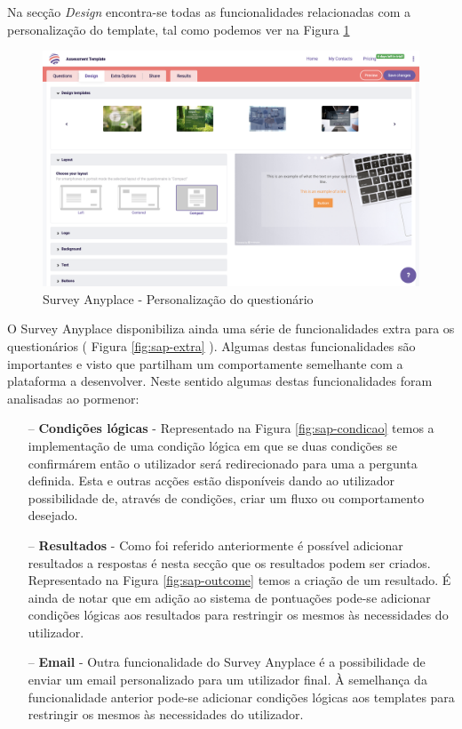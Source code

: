 Na secção \textit{Design} encontra-se todas as funcionalidades relacionadas com a personalização do template, tal como podemos ver na Figura \ref{fig:sap-design}

\begin{figure}[ht!]
	\begin{center}
		\includegraphics[width=1\textwidth]{img/sap/design}
		\caption{Survey Anyplace - Personalização do questionário}
		\label{fig:sap-design}
	\end{center}
\end{figure}

O Survey Anyplace disponibiliza ainda uma série de funcionalidades extra para os questionários ( Figura \ref{fig:sap-extra} ). Algumas destas funcionalidades são importantes e visto que partilham um comportamente semelhante com a plataforma a desenvolver. Neste sentido algumas destas funcionalidades foram analisadas ao pormenor:
\begin{itemize}
	\item[--] \textbf{Condições lógicas} - Representado na Figura \ref{fig:sap-condicao} temos a implementação de uma condição lógica em que se duas condições se confirmárem então o utilizador será redirecionado para uma a pergunta definida. Esta e outras acções estão disponíveis dando ao utilizador possibilidade de, através de condições, criar um fluxo ou comportamento desejado.
	\item[--] \textbf{Resultados} - Como foi referido anteriormente é possível adicionar resultados a respostas é nesta secção que os resultados podem ser criados. Representado na Figura \ref{fig:sap-outcome} temos a criação de um resultado. É ainda de notar que em adição ao sistema de pontuações pode-se adicionar condições lógicas aos resultados para restringir os mesmos às necessidades do utilizador.
	\item[--] \textbf{Email} - Outra funcionalidade do Survey Anyplace é a possibilidade de enviar um email personalizado para um utilizador final. À semelhança da funcionalidade anterior pode-se adicionar condições lógicas aos templates para restringir os mesmos às necessidades do utilizador.
\end{itemize}

